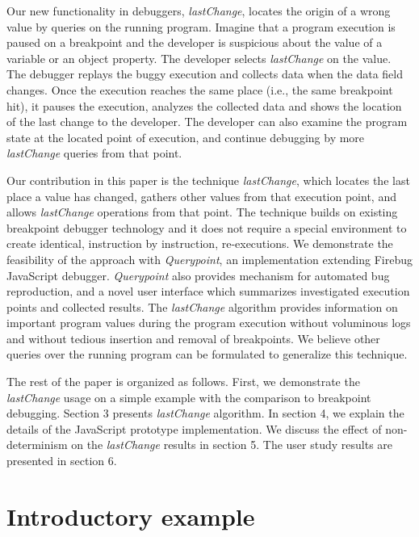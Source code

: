 \documentclass{sig-alternate}
\begin{document}
Our new functionality in
debuggers, \textit{lastChange}, locates the origin of a wrong
value by queries on the running program.
Imagine that a program execution is
paused on a breakpoint and the developer is
suspicious about the value of a variable or an object property. The
developer selects \textit{lastChange} on the value. The debugger
replays the buggy execution and collects data
when the data field changes. Once the execution reaches the same place 
(i.e., the same
breakpoint hit), it pauses the execution, analyzes the collected data
and shows the location of the last change to the developer. The
developer can also examine the program state at the located point of
execution, and continue debugging by more \textit{lastChange} queries
from that point.

Our contribution in this paper is the technique \textit{lastChange},
which locates the last place a value has changed, gathers other values
from that execution point, and allows \textit{lastChange} operations
from that point. The technique builds on existing breakpoint debugger
technology  and it does not require a special environment to
create identical, instruction by instruction, re-executions. We demonstrate the feasibility of the approach with 
\textit{Querypoint}, an implementation extending Firebug
JavaScript debugger. \textit{Querypoint} also provides mechanism for
automated bug reproduction, and a novel user interface which
summarizes investigated execution points and collected results.
The \textit{lastChange} algorithm provides information on important program
values during the program execution without voluminous logs and without tedious
 insertion and removal of breakpoints. We believe other queries over the
 running program can be formulated to generalize this technique.

The rest of the paper is organized as follows. First, we demonstrate
the \textit{lastChange} usage on a simple example with the comparison
to breakpoint debugging. Section 3 presents \textit{lastChange}
algorithm. In section 4, we explain the details of the JavaScript
prototype implementation. We discuss the effect of non-determinism on
the \textit{lastChange} results in section 5. The user study results 
are presented in section 6. %


\section{Introductory example}
\label{sec:introExample}
\end{document}
